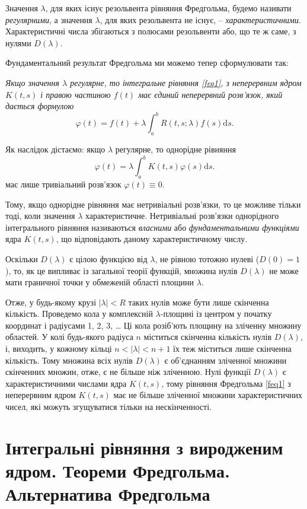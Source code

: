 \documentclass[14pt,twoside]{extreport}
\theoremstyle{mystyle}
\numberwithin{equation}{chapter}
\begin{document}
Значення $\lambda$, для яких існує резольвента рівняння Фредгольма, будемо називати \emph{регулярними}, а значення $\lambda$, для яких резольвента не існує, -- \emph{характеристичними}. Характеристичні числа збігаються з полюсами резольвенти або, що те ж саме, з нулями $D(\lambda)$.

Фундаментальний результат Фредгольма ми можемо тепер сформулювати так:

\emph{Якщо значення $\lambda$ регулярне, то інтегральне рівняння \eqref{feq1}, з неперервним ядром $K(t, s)$ і правою частиною $f(t)$ має єдиний неперервний розв'язок, який дається формулою}
\[
\varphi(t)=f(t)+\lambda\int_{a}^{b}R(t, s;\lambda)f(s)\mathrm{d}s.
\]

Як наслідок дістаємо: якщо $\lambda$ регулярне, то однорідне рівняння
\[
\varphi(t)=\lambda\int_{a}^{b}K(t, s)\varphi(s)\mathrm{d}s.
\]
має лише тривіальний розв'язок $\varphi(t) \equiv 0$.

Тому, якщо однорідне рівняння має нетривіальні розв'язки, то це можливе тільки тоді, коли значення $\lambda$ характеристичне. Нетривіальні розв'язки однорідного інтегрального рівняння називаються \emph{власними} або \emph{фундаментальними функціями} ядра $K(t, s)$, що відповідають даному характеристичному числу.

Оскільки $D(\lambda)$ є цілою функцією від $\lambda$, не рівною тотожно нулеві ($D(0) = 1$), то, як це випливає із загальної теорії функцій, множина нулів $D(\lambda)$ не може мати граничної точки у обмеженій області площини $\lambda$.

Отже, у будь-якому крузі $|\lambda|<R$ таких нулів може бути лише скінченна кількість. Проведемо кола у комплексній $\lambda$-площині із центром у початку координат і радіусами 1, 2, 3,  … Ці кола розіб'ють площину на зліченну множину областей. У колі будь-якого радіуса $n$ міститься скінченна кількість нулів $D(\lambda)$, і, виходить, у кожному кільці $n < |\lambda| < n + 1$ їх теж міститься лише скінченна кількість. Тому множина всіх нулів $D(\lambda)$ є об'єднанням зліченної множини скінченних множин, отже, є не більше ніж зліченною. Нулі функції $D(\lambda)$ є характеристичними числами ядра $K(t, s)$, тому рівняння Фредгольма \eqref{feq1} з неперервним ядром $K(t, s)$ має не більше зліченної множини характеристичних чисел, які можуть згущуватися тільки на нескінченності.

\section{Інтегральні рівняння з виродженим ядром. Теореми Фредгольма. Альтернатива Фредгольма}\label{thmsfred}
\end{document}
